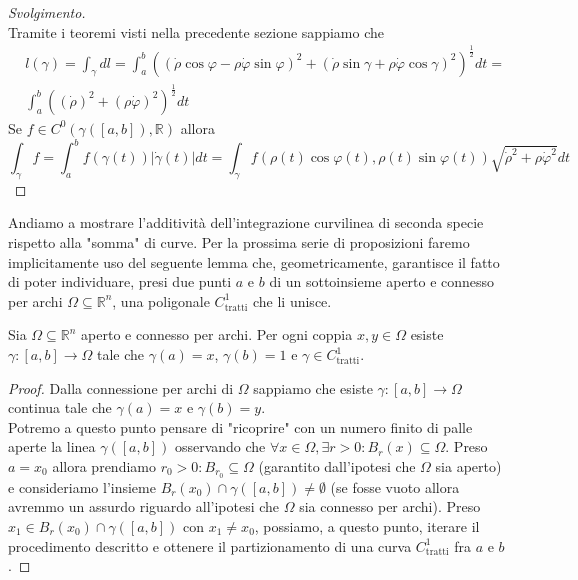 \begin{proof}[Svolgimento] \hspace{1cm} \\
Tramite i teoremi visti nella precedente sezione sappiamo che
\begin{align*}
&l(\gamma) = \int_\gamma dl = \int_a^b ( (\dot{\rho} \cos{\varphi} - \rho \dot{\varphi} \sin{\varphi})^ 2 + (\dot{\rho} \sin{\gamma} + \rho \dot{\varphi} \cos{\gamma})^2)^{\frac{1}{2}} dt = \\
&\int_a^b ((\dot{\rho})^2 + (\rho \dot{\varphi})^2)^{\frac{1}{2}}dt
\end{align*}
Se $f \in C^0(\gamma([a, b]), \mathbb{R})$ allora
$$
\int_\gamma f = \int_a^b f(\gamma(t))|\dot{\gamma}(t)|dt = \int_\gamma f(\rho(t) \cos{\varphi(t)}, \rho(t) \sin{\varphi(t)}) \sqrt{\dot{\rho}^2 + \rho \dot{\varphi}^2} dt
$$
\end{proof}
Andiamo a mostrare l'additività dell'integrazione curvilinea di seconda specie rispetto alla "somma" di curve.
Per la prossima serie di proposizioni faremo implicitamente uso del seguente lemma che, geometricamente, garantisce il fatto di poter individuare, presi due punti $a$ e $b$ di un sottoinsieme aperto e connesso per archi $\Omega \subseteq \mathbb{R}^n$, una poligonale $C^1_\text{tratti}$ che li unisce.
\begin{lemma}
	Sia $\Omega \subseteq \mathbb{R}^n$ aperto e connesso per archi. Per ogni coppia $x, y \in \Omega$ esiste $\gamma:[a, b] \to \Omega$ tale che $\gamma(a) = x$, $\gamma(b)=1$ e $\gamma \in C^1_\text{tratti}$.
\end{lemma}
\begin{proof}
	Dalla connessione per archi di $\Omega$ sappiamo che esiste $\gamma: [a, b] \to \Omega$ continua tale che $\gamma(a) = x$ e $\gamma(b) = y$. \\
	Potremo a questo punto pensare di "ricoprire" con un numero finito di palle aperte la linea $\gamma([a, b])$ osservando che $\forall x \in \Omega, \exists r > 0: B_r(x) \subseteq \Omega$. Preso $a = x_0$ allora prendiamo $r_0 > 0: B_{r_0} \subseteq \Omega$ (garantito dall'ipotesi che $\Omega$ sia aperto) e consideriamo l'insieme
	$B_r(x_0) \cap \gamma([a, b]) \neq \emptyset$ (se fosse vuoto allora avremmo un assurdo riguardo all'ipotesi che $\Omega$ sia connesso per archi). Preso $x_1 \in B_r(x_0) \cap \gamma([a, b])$ con $x_1 \neq x_0$, possiamo, a questo punto, iterare il procedimento descritto e ottenere il partizionamento di una curva $C^1_\text{tratti}$ fra $a$ e $b$.
\end{proof}
